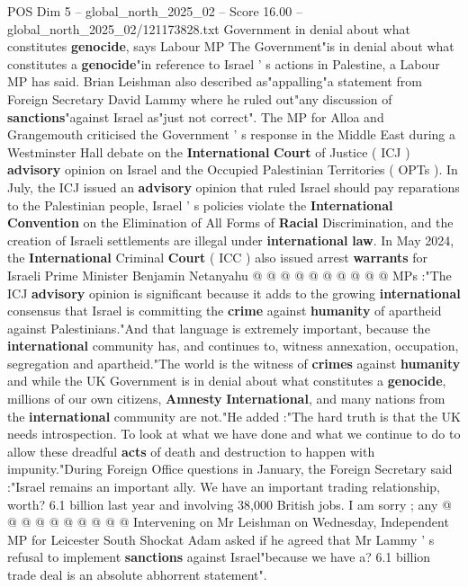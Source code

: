 \begin{textsample}{POS Dim 5 – global\_north\_2025\_02 – Score 16.00 – global\_north\_2025\_02/121173828.txt}  \label{ex:f5_pos_332}
Government in denial about what constitutes \textbf{genocide}, says Labour MP The Government"is in denial about what constitutes a \textbf{genocide}"in reference to Israel ' s actions in Palestine, a Labour MP has said.
Brian Leishman also described as"appalling"a statement from Foreign Secretary David Lammy where he ruled out"any discussion of \textbf{sanctions}"against Israel as"just not correct".
The MP for Alloa and Grangemouth criticised the Government ' s response in the Middle East during a Westminster Hall debate on the \textbf{International} \textbf{Court} of Justice ( ICJ ) \textbf{advisory} opinion on Israel and the Occupied Palestinian Territories ( OPTs ).
In July, the ICJ issued an \textbf{advisory} opinion that ruled Israel should pay reparations to the Palestinian people, Israel ' s policies violate the \textbf{International} \textbf{Convention} on the Elimination of All Forms of \textbf{Racial} Discrimination, and the creation of Israeli settlements are illegal under \textbf{international} \textbf{law}.
In May 2024, the \textbf{International} Criminal \textbf{Court} ( ICC ) also issued arrest \textbf{warrants} for Israeli Prime Minister Benjamin Netanyahu @ @ @ @ @ @ @ @ @ @ MPs :"The ICJ \textbf{advisory} opinion is significant because it adds to the growing \textbf{international} consensus that Israel is committing the \textbf{crime} against \textbf{humanity} of apartheid against Palestinians."And that language is extremely important, because the \textbf{international} community has, and continues to, witness annexation, occupation, segregation and apartheid."The world is the witness of \textbf{crimes} against \textbf{humanity} and while the UK Government is in denial about what constitutes a \textbf{genocide}, millions of our own citizens, \textbf{Amnesty} \textbf{International}, and many nations from the \textbf{international} community are not."He added :"The hard truth is that the UK needs introspection.
To look at what we have done and what we continue to do to allow these dreadful \textbf{acts} of death and destruction to happen with impunity."During Foreign Office questions in January, the Foreign Secretary said :"Israel remains an important ally.
We have an important trading relationship, worth? 6.1 billion last year and involving 38,000 British jobs.
I am sorry ; any @ @ @ @ @ @ @ @ @ @ Intervening on Mr Leishman on Wednesday, Independent MP for Leicester South Shockat Adam asked if he agreed that Mr Lammy ' s refusal to implement \textbf{sanctions} against Israel"because we have a? 6.1 billion trade deal is an absolute abhorrent statement".

\end{textsample}
